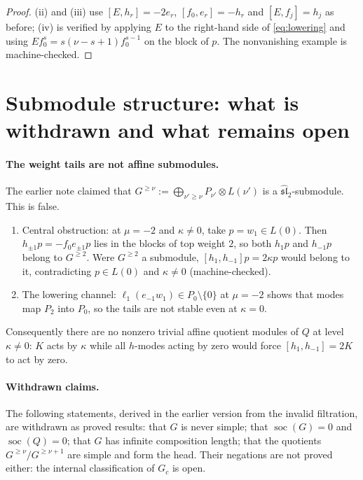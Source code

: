 \documentclass[11pt]{article}
\newcommand{\g}{\widehat{\mathfrak{sl}}_2}
\begin{document}
\begin{proof}
(ii) and (iii) use $[E,h_r]=-2e_r$, $[f_0,e_r]=-h_r$ and $[E,f_j]=h_j$ as
before; (iv) is verified by applying $E$ to the right-hand side of
\eqref{eq:lowering} and using $Ef_0^s=s(\nu-s+1)f_0^{s-1}$ on the block of
$p$. The nonvanishing example is machine-checked.
\end{proof}

\section{Submodule structure: what is withdrawn and what remains open}

\paragraph{The weight tails are not affine submodules.}
The earlier note claimed that
$G^{\ge\nu}:=\bigoplus_{\nu'\ge\nu}P_{\nu'}\otimes L(\nu')$ is a
$\g$-submodule. This is false.
\begin{enumerate}
\item[(i)] Central obstruction: at $\mu=-2$ and $\kappa\ne0$, take
$p=w_1\in L(0)$. Then $h_{\pm1}p=-f_0e_{\pm1}p$ lies in the blocks of top
weight $2$, so both $h_1p$ and $h_{-1}p$ belong to $G^{\ge2}$. Were
$G^{\ge2}$ a submodule, $[h_1,h_{-1}]p=2\kappa p$ would belong to it,
contradicting $p\in L(0)$ and $\kappa\ne0$ (machine-checked).
\item[(ii)] The lowering channel: $\ell_1(e_{-1}w_1)\in P_0\setminus\{0\}$
at $\mu=-2$ shows that modes map $P_2$ into $P_0$, so the tails are not
stable even at $\kappa=0$.
\end{enumerate}
Consequently there are no nonzero trivial affine quotient modules of $Q$ at
level $\kappa\ne0$: $K$ acts by $\kappa$ while all $h$-modes acting by
zero would force $[h_1,h_{-1}]=2K$ to act by zero.

\paragraph{Withdrawn claims.}
The following statements, derived in the earlier version from the invalid
filtration, are withdrawn as proved results: that $G$ is never simple; that
$\operatorname{soc}(G)=0$ and $\operatorname{soc}(Q)=0$; that $G$ has
infinite composition length; that the quotients $G^{\ge\nu}/G^{\ge\nu+1}$
are simple and form the head. Their negations are not proved either: the
internal classification of $G_c$ is open.
\end{document}
